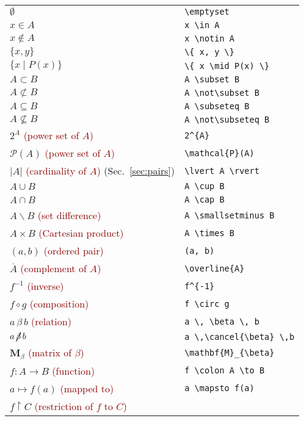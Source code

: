 \documentclass[a4paper,10pt,landscape]{article}
\theoremstyle{definition}
\theoremstyle{remark}
\newcommand{\refsec}[1]{Sec.~\ref{#1}}
\newcommand{\hDesc}[1]{\textcolor{darkred}{(#1)}} %
\begin{document}
\begin{multicols}{3}
\begin{tabular}{@{}ll@{}}
	$\emptyset$	&\verb!\emptyset!\\
	$x \in A$	&\verb!x \in A!\\
	$x \notin A$	&\verb!x \notin A!\\
	$\{ x, y \}$	& \verb!\{ x, y \}!\\
	$\{ x \mid P(x) \}$	&\verb!\{ x \mid P(x) \}!\\
	$A \subset B$	&\verb!A \subset B!\\
	$A \not\subset B$	&\verb!A \not\subset B!\\
	$A \subseteq B$	&\verb!A \subseteq B!\\
	$A \not\subseteq B$	&\verb!A \not\subseteq B!\\
	$2^{A}$ 	\hDesc{power set of $A$}	&\verb!2^{A}!\\
	$\mathcal{P}(A)$ 	\hDesc{power set of $A$}	&\verb!\mathcal{P}(A)!\\
	$\lvert A \rvert$  	\hDesc{cardinality of $A$} (\refsec{sec:pairs})	&\verb!\lvert A \rvert!\\
	$A \cup B$	&\verb!A \cup B!\\
	$A \cap B$	&\verb!A \cap B!\\
	$A \smallsetminus B$	\hDesc{set difference}	&\verb!A \smallsetminus B!\\
	$A \times B$  	\hDesc{Cartesian product}	&\verb!A \times B!\\
	$(a, b)$ 	\hDesc{ordered pair}	&\verb!(a, b)!\\
%	
	$\overline{A}$	\hDesc{complement of $A$}	&\verb!\overline{A}!\\
	$f^{-1}$	\hDesc{inverse}	&\verb!f^{-1}!\\
	$f \circ g$	\hDesc{composition}	&\verb!f \circ g!\\
	$a \, \beta \, b$ 	\hDesc{relation}	&\verb!a \, \beta \, b!\\
	$a \, \cancel{\beta} \, b$	&\verb!a \,\cancel{\beta} \,b!\\
	$\mathbf{M}_{\beta}$ 	\hDesc{matrix of $\beta$}	&\verb!\mathbf{M}_{\beta}!\\
	$f \colon A \to B$	\hDesc{function}	&\verb!f \colon A \to B!\\
	$a \mapsto f(a)$	\hDesc{mapped to}	&\verb!a \mapsto f(a)!\\
	$f \upharpoonright C$	\hDesc{restriction of $f$ to $C$}	

\end{tabular}
\end{multicols}
\end{document}

